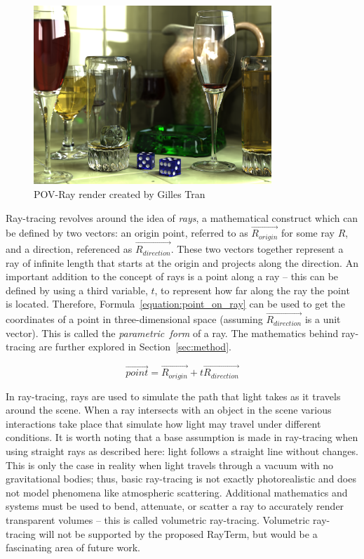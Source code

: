 \documentclass[11pt]{article}
\newcommand{\name}{{\sc RayTerm}}
\newcommand{\rayorg}{\vec{R_{origin}}}
\newcommand{\raydir}{\vec{R_{direction}}}
\begin{document}
\begin{figure}[htb]
  \centering
  \includegraphics[width=0.8\textwidth]{resources/glasses_povray}
  \caption{POV-Ray render created by Gilles Tran \cite{povray2006render}}
  \label{fig:povray_render}
\end{figure}


Ray-tracing revolves around the idea of {\it rays}, a mathematical construct which can be defined by two vectors: an origin point, referred to as $\rayorg$ for some ray $R$, and a direction, referenced as $\raydir$.
These two vectors together represent a ray of infinite length that starts at the origin and projects along the direction.
An important addition to the concept of rays is a point along a ray -- this can be defined by using a third variable, $t$, to represent how far along the ray the point is located.
Therefore, Formula~\ref{equation:point_on_ray} can be used to get the coordinates of a point in three-dimensional space (assuming $\raydir$ is a unit vector).
This is called the {\it parametric~form} of a ray.
The mathematics behind ray-tracing are further explored in Section~\ref{sec:method}.

\begin{equation}
  \label{equation:point_on_ray}
  \vec{point} = \rayorg + t\raydir
\end{equation}

In ray-tracing, rays are used to simulate the path that light takes as it travels around the scene.
When a ray intersects with an object in the scene various interactions take place that simulate how light may travel under different conditions.
It is worth noting that a base assumption is made in ray-tracing when using straight rays as described here: light follows a straight line without changes.
This is only the case in reality when light travels through a vacuum with no gravitational bodies; thus, basic ray-tracing is not exactly photorealistic and does not model phenomena like atmospheric scattering.
Additional mathematics and systems must be used to bend, attenuate, or scatter a ray to accurately render transparent volumes -- this is called volumetric ray-tracing.
Volumetric ray-tracing will not be supported by the proposed \name, but would be a fascinating area of future work.
\end{document}
